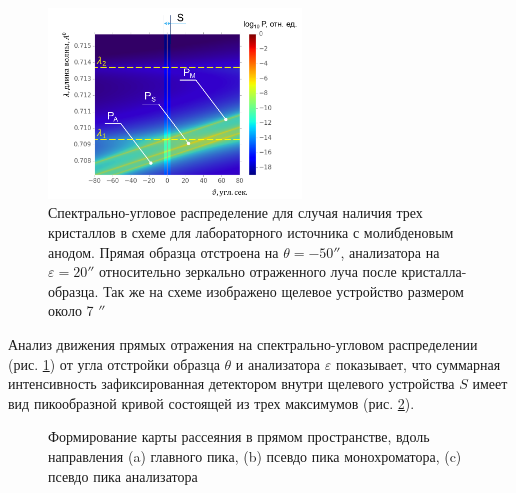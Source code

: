   \begin{figure}[H]
    \centering
    \includegraphics[width=0.6\textwidth]{images/triple_map.png}
    \caption{Спектрально-угловое распределение для случая наличия трех кристаллов в схеме для
    лабораторного источника с молибденовым анодом.
    Прямая образца отстроена на $\theta = - 50''$, анализатора на $\varepsilon = 20''$ относительно
    зеркально отраженного луча после кристалла-образца. Так же на схеме изображено щелевое устройство размером около 7 $''$}
    \label{ris:triple_map}
  \end{figure}

Анализ движения прямых отражения на спектрально-угловом распределении (рис. \ref{ris:triple_map}) от угла отстройки образца $\theta$ и
анализатора $\varepsilon$ показывает, что суммарная интенсивность зафиксированная детектором внутри щелевого устройства
$S$ имеет вид пикообразной кривой состоящей из трех максимумов (рис. \ref{ris:triple_map_piks}).

\begin{figure}[H]
  \centering
  \hfill
  \hfill
  \caption{Формирование карты рассеяния в прямом пространстве, вдоль направления (a) главного пика,
  (b) псевдо пика монохроматора, (c) псевдо пика анализатора}
  \label{ris:triple_map_piks}
\end{figure}

